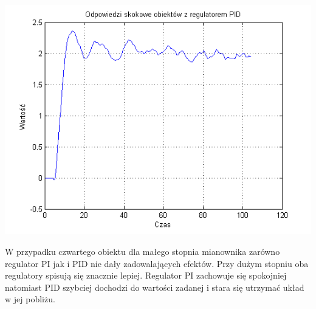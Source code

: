 \documentclass[10pt,a4paper]{article}
\begin{document}
\includegraphics[scale=1]{images/cztery/skrypt_08.png}\\
\newpage

W przypadku czwartego obiektu dla małego stopnia mianownika zarówno regulator PI jak i PID nie dały zadowalających efektów. Przy dużym stopniu oba regulatory spisują się znacznie lepiej. Regulator PI zachowuje się spokojniej natomiast PID szybciej dochodzi do wartości zadanej i stara się utrzymać układ w jej pobliżu.
\newpage
\end{document}
